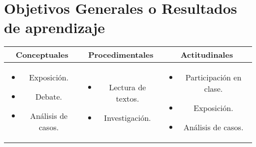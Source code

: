 \section{Objetivos Generales o Resultados de aprendizaje}
\begin{tabular}{ |c|c|c| }
    \hline
    \textbf{Conceptuales}     & \textbf{Procedimentales} & \textbf{Actitudinales} \\
    \hline
    \begin{minipage}
        [t]{0.3\textwidth}
        \begin{itemize}[leftmargin=10pt]
            \item Exposición.
            \item Debate.
            \item Análisis de casos.
        \end{itemize}
        \vspace{0.2cm}
    \end{minipage} &
    \begin{minipage}
        [t]{0.3\textwidth}
        \begin{itemize}[leftmargin=10pt]
            \item Lectura de textos.
            \item Investigación.
        \end{itemize}
        \vspace{0.2cm}
    \end{minipage} &
    \begin{minipage}
        [t]{0.3\textwidth}
        \begin{itemize}[leftmargin=10pt]
            \item Participación en clase.
            \item Exposición.
            \item Análisis de casos.
        \end{itemize}
        \vspace{0.2cm}
    \end{minipage}                                                      \\
    \hline
\end{tabular}
\pagebreak